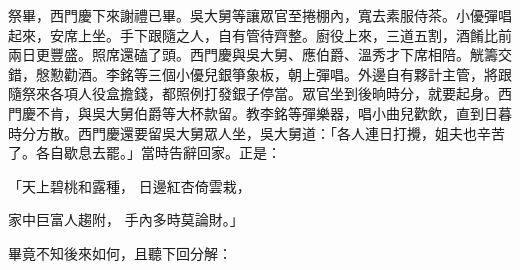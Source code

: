 祭畢，西門慶下來謝禮已畢。吳大舅等讓眾官至捲棚內，寬去素服侍茶。小優彈唱起來，安席上坐。手下跟隨之人，自有管待齊整。廚役上來，三道五割，酒餚比前兩日更豐盛。照席還磕了頭。西門慶與吳大舅、應伯爵、溫秀才下席相陪。觥籌交錯，慇懃勸酒。李銘等三個小優兒銀箏象板，朝上彈唱。外邊自有夥計主管，將跟隨祭來各項人役盒擔錢，都照例打發銀子停當。眾官坐到後晌時分，就要起身。西門慶不肯，與吳大舅伯爵等大杯款留。教李銘等彈樂器，唱小曲兒歡飲，直到日暮時分方散。西門慶還要留吳大舅眾人坐，吳大舅道：「各人連日打攪，姐夫也辛苦了。各自歇息去罷。」當時告辭回家。正是：

「天上碧桃和露種，  日邊紅杏倚雲栽，

家中巨富人趨附，  手內多時莫論財。」

畢竟不知後來如何，且聽下回分解：

